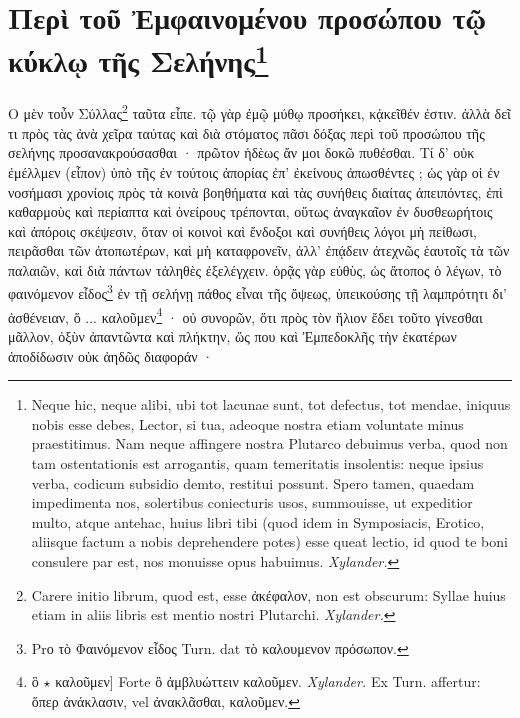 \documentclass[a4paper, 11pt, oneside, polutonikogreek, german]{article}
\begin{document}
\section[Περὶ τοῦ Ἐμφαινομένου προσώπου τῷ κύκλῳ τῆς Σελήνης]{Περὶ τοῦ Ἐμφαινομένου προσώπου τῷ κύκλῳ τῆς Σελήνης\footnote{Neque hic, neque alibi, ubi tot lacunae sunt, tot defectus, tot mendae, iniquus nobis esse debes, Lector, si tua, adeoque nostra etiam voluntate minus praestitimus. Nam neque affingere nostra Plutarco debuimus verba, quod non tam ostentationis est arrogantis, quam temeritatis insolentis: neque ipsius verba, codicum subsidio demto, restitui possunt. Spero tamen, quaedam impedimenta nos, solertibus coniecturis usos, summouisse, ut expeditior multo, atque antehac, huius libri tibi (quod idem in Symposiacis, Erotico, aliisque factum a nobis deprehendere potes) esse queat lectio, id quod te boni consulere par est, nos monuisse opus habuimus. \emph{Xylander.}}}
\paragraph{}
Ο μὲν τοὖν Σύλλας\footnote{Carere initio librum, quod est, esse ἀκέφαλον, non est obscurum: Syllae huius etiam in aliis libris est mentio nostri Plutarchi. \emph{Xylander.}} ταῦτα εἶπε. τῷ γὰρ ἐμῷ μύθῳ προσήκει, κᾀκεῖθέν ἐστιν. ἀλλὰ δεῖ τι πρὸς τὰς ἀνὰ χεῖρα ταύτας καὶ διὰ στόματος πᾶσι δόξας περὶ τοῦ προσώπου τῆς σελήνης προσανακρούσασθαι · πρῶτον ἡδὲως ἄν μοι δοκῶ πυθέσθαι. Τί δ' οὐκ ἐμέλλμεν (εἶπον) ὑπὸ τῆς ἐν τούτοις ἀπορίας ἐπ' ἐκείνους ἀπωσθέντες ; ὡς γὰρ οἱ ἐν νοσήμασι χρονίοις πρὸς τὰ κοινὰ βοηθήματα καὶ τὰς συνήθεις διαίτας ἀπειπόντες, ἐπὶ καθαρμοὺς καὶ περίαπτα καὶ ὀνείρους τρέπονται, οὕτως ἀναγκαῖον ἐν δυσθεωρήτοις καὶ ἀπόροις σκέψεσιν, ὅταν οἱ κοινοὶ καὶ ἔνδοξοι καὶ συνήθεις λόγοι μὴ πείθωσι, πειρᾶσθαι τῶν ἀτοπωτέρων, καὶ μὴ καταφρονεῖν, ἀλλ' ἐπᾴδειν ἀτεχνῶς ἑαυτοῖς τὰ τῶν παλαιῶν, καὶ διὰ πάντων τἀληθὲς ἐξελέγχειν. ὁρᾷς γὰρ εὐθὺς, ὡς ἄτοπος ὁ λέγων, τὸ φαινόμενον εἶδος\footnote{Ρrο τὸ Φαινόμενον εἶδος Turn. dat τὸ καλουμενον πρόσωπον.} ἐν τῇ σελήνῃ πάθος εἶναι τῆς ὄψεως, ὑπεικούσης τῇ λαμπρότητι δι' ἀσθένειαν, ὅ ... καλοῦμεν\footnote{ὃ $\star$ καλοῦμεν] Forte ὃ ἀμβλυώττειν καλοῦμεν. \emph{Xylander.} Ex Turn. affertur: ὅπερ ἀνάκλασιν, vel ἀνακλᾶσθαι, καλοῦμεν.} · οὐ συνορῶν, ὅτι πρὸς τὸν ἥλιον ἔδει τοῦτο γίνεσθαι μᾶλλον, ὀξὺν ἀπαντῶντα καὶ πλήκτην, ὥς που καὶ Ἐμπεδοκλῆς τὴν ἑκατέρων ἀποδίδωσιν οὐκ ἀηδῶς διαφοράν ·
\end{document}
